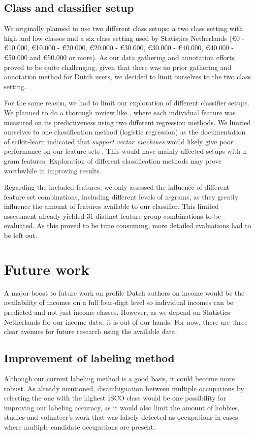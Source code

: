 \documentclass[
10pt, %
a4paper, %
oneside, %
headinclude,footinclude, %
] {book}%
\begin{document}
\subsection{Class and classifier setup}
We originally planned to use two different class setups: a two class setting with high and low classes and a six class setting used by Statistics Netherlands (\euro 0 - \euro 10.000, \euro 10.000 - \euro 20.000, \euro 20.000 - \euro 30.000, \euro 30.000 - \euro 40.000, \euro 40.000 - \euro 50.000 and \euro 50.000 or more). As our data gathering and annotation efforts proved to be quite challenging, given that there was no prior gathering and annotation method for Dutch users, we decided to limit ourselves to the two class setting.

For the same reason, we had to limit our exploration of different classifier setups. We planned to do a thorough review like \citet{flekova}, where each individual feature was measured on its predictiveness using two different regression methods. We limited ourselves to one classification method (logistic regression) as the documentation of scikit-learn indicated that \textit{support vector machines} would likely give poor performance on our feature sets \citep{svm}. This would have mainly affected setups with n-gram features. Exploration of different classification methods may prove worthwhile in improving results.

Regarding the included features, we only assessed the influence of different feature set combinations, including different levels of n-grams, as they greatly influence the amount of features available to our classifier. This limited assessment already yielded 31 distinct feature group combinations to be evaluated. As this proved to be time consuming, more detailed evaluations had to be left out.

\section{Future work}
\label{futurework}
A major boost to future work on profile Dutch authors on income would be the availability of incomes on a full four-digit level so individual incomes can be predicted and not just income classes. However, as we depend on Statistics Netherlands for our income data, it is out of our hands. For now, there are three clear avenues for future research using the available data.

\subsection{Improvement of labeling method}
Although our current labeling method is a good basis, it could become more robust. As already mentioned, disambiguation between multiple occupations by selecting the one with the highest ISCO class would be one possibility for improving our labeling accuracy, as it would also limit the amount of hobbies, studies and volunteer's work that was falsely detected as occupations in cases where multiple candidate occupations are present.
\end{document}
